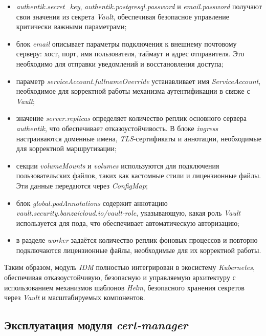 \begin{itemize}
    \item \textit{authentik.secret\_key}, \textit{authentik.postgresql.password} и \textit{email.password} получают свои значения из секрета \textit{Vault}, обеспечивая безопасное управление критически важными параметрами;
    
    \item блок \textit{email} описывает параметры подключения к внешнему почтовому серверу: хост, порт, имя пользователя, таймаут и адрес отправителя. Это необходимо для отправки уведомлений и восстановления доступа;
    
    \item параметр \textit{serviceAccount.fullnameOverride} устанавливает имя \textit{ServiceAccount}, необходимое для корректной работы механизма аутентификации в связке с \textit{Vault};
    
    \item значение \textit{server.replicas} определяет количество реплик основного сервера \textit{authentik}, что обеспечивает отказоустойчивость. В блоке \textit{ingress} настраиваются доменные имена, \textit{TLS}-сертификаты и аннотации, необходимые для корректной маршрутизации;
    
    \item секции \textit{volumeMounts} и \textit{volumes} используются для подключения пользовательских файлов, таких как кастомные стили и лицензионные файлы. Эти данные передаются через \textit{ConfigMap};
    
    \item блок \textit{global.podAnnotations} содержит аннотацию \textit{vault.security.banzaicloud.io/vault-role}, указывающую, какая роль \textit{Vault} используется для пода, что обеспечивает автоматическую авторизацию;
    
    \item в разделе \textit{worker} задаётся количество реплик фоновых процессов и повторно подключаются лицензионные файлы, необходимые для их корректной работы.
\end{itemize}

Таким образом, модуль \textit{IDM} полностью интегрирован в экосистему \textit{Kubernetes}, обеспечивая отказоустойчивую, безопасную и управляемую архитектуру с использованием механизмов шаблонов \textit{Helm}, безопасного хранения секретов через \textit{Vault} и масштабируемых компонентов.



\subsection{Эксплуатация модуля \textit{cert-manager}}


